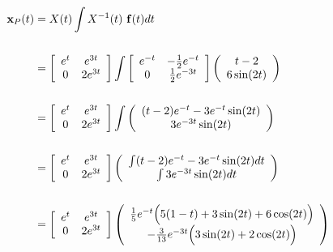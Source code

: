 \begin{itemize}
\begin{align*}
{\bf{x}}_P(t) &= X(t) \int X^{-1}(t) \ {\bf{f}}(t) dt \\ \\
&=  \left[  \begin{array}{cc} e^{t} & e^{3t} \\ 0 & 2e^{3t} \\  \end{array}\right] \int \left[ \begin{array}{cc} e^{-t} & -\frac{1}{2}e^{-t} \\ 0 & \frac{1}{2} e^{-3t}  \end{array}\right] \left( \begin{array}{c}  t-2 \\ 6\sin(2t)   \end{array}\right) \\ \\
&=  \left[  \begin{array}{cc} e^{t} & e^{3t} \\ 0 & 2e^{3t} \\  \end{array}\right] \int \left( \begin{array}{c} (t-2)e^{-t} - 3e^{-t} \sin(2t) \\ 3e^{-3t} \sin(2t)   \end{array}\right) \\ \\
&=  \left[  \begin{array}{cc} e^{t} & e^{3t} \\ 0 & 2e^{3t} \\  \end{array}\right] \left( \begin{array}{c} \int (t-2)e^{-t} - 3e^{-t} \sin(2t) dt \\ \int 3e^{-3t} \sin(2t) dt   \end{array}\right) \\ \\
&=  \left[  \begin{array}{cc} e^{t} & e^{3t} \\ 0 & 2e^{3t} \\  \end{array}\right] \left( \begin{array}{c} \frac{1}{5} e^{-t} \Big( 5(1-t)+3\sin(2t)+6\cos(2t) \Big) \\ -\frac{3}{13} e^{-3t} \Big( 3\sin(2t)+2\cos(2t) \Big) \end{array} \right) \\ \\

\end{align*}
\end{itemize}
